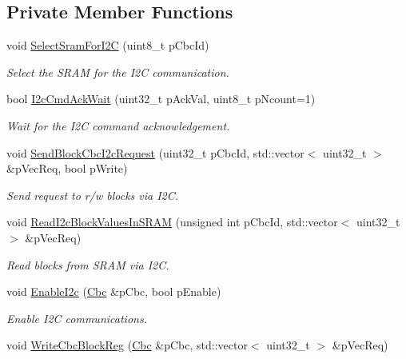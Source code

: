 \subsection*{Private Member Functions}
\begin{DoxyCompactItemize}
\item 
void \hyperlink{class_ph2___hw_interface_1_1_cbc_interface_afecc0475c57cec54253864c7407e765a}{Select\-Sram\-For\-I2\-C} (uint8\-\_\-t p\-Cbc\-Id)
\begin{DoxyCompactList}\small\item\em Select the S\-R\-A\-M for the I2\-C communication. \end{DoxyCompactList}\item 
bool \hyperlink{class_ph2___hw_interface_1_1_cbc_interface_ad171e07d3777cebcdd1f65cc03915e7b}{I2c\-Cmd\-Ack\-Wait} (uint32\-\_\-t p\-Ack\-Val, uint8\-\_\-t p\-Ncount=1)
\begin{DoxyCompactList}\small\item\em Wait for the I2\-C command acknowledgement. \end{DoxyCompactList}\item 
void \hyperlink{class_ph2___hw_interface_1_1_cbc_interface_a3abc2efbdff0957b686341b3084b30a2}{Send\-Block\-Cbc\-I2c\-Request} (uint32\-\_\-t p\-Cbc\-Id, std\-::vector$<$ uint32\-\_\-t $>$ \&p\-Vec\-Req, bool p\-Write)
\begin{DoxyCompactList}\small\item\em Send request to r/w blocks via I2\-C. \end{DoxyCompactList}\item 
void \hyperlink{class_ph2___hw_interface_1_1_cbc_interface_a835236b210e7b642f471d862cb8c5f47}{Read\-I2c\-Block\-Values\-In\-S\-R\-A\-M} (unsigned int p\-Cbc\-Id, std\-::vector$<$ uint32\-\_\-t $>$ \&p\-Vec\-Req)
\begin{DoxyCompactList}\small\item\em Read blocks from S\-R\-A\-M via I2\-C. \end{DoxyCompactList}\item 
void \hyperlink{class_ph2___hw_interface_1_1_cbc_interface_a33464f7a75cd7e392d1324e223145b92}{Enable\-I2c} (\hyperlink{class_ph2___hw_description_1_1_cbc}{Cbc} \&p\-Cbc, bool p\-Enable)
\begin{DoxyCompactList}\small\item\em Enable I2\-C communications. \end{DoxyCompactList}\item 
void \hyperlink{class_ph2___hw_interface_1_1_cbc_interface_a47d3c0291aae360b85195ee3c22846e4}{Write\-Cbc\-Block\-Reg} (\hyperlink{class_ph2___hw_description_1_1_cbc}{Cbc} \&p\-Cbc, std\-::vector$<$ uint32\-\_\-t $>$ \&p\-Vec\-Req)

\end{DoxyCompactItemize}
